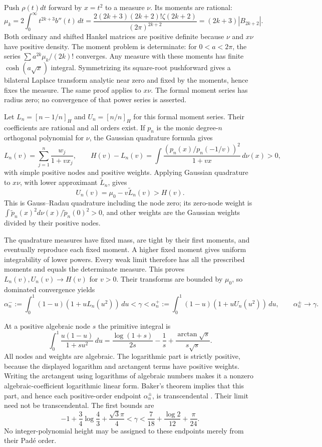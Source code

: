 \documentclass[11pt,a4paper]{article}
\theoremstyle{definition}
\theoremstyle{remark}
\numberwithin{equation}{section}
\begin{document}
Push $\rho(t)dt$ forward by $x=t^2$ to a measure $\nu$. Its moments are rational:
\[
 \mu_k=2\int_0^\infty t^{2k+3}b''(t)\,dt
 =\frac{2(2k+3)(2k+2)!\zeta(2k+2)}{(2\pi)^{2k+2}}
 =(2k+3)|B_{2k+2}|.
\]
Both ordinary and shifted Hankel matrices are positive definite because $\nu$ and $x\nu$ have positive density. The moment problem is determinate: for $0<a<2\pi$, the series $\sum a^{2k}\mu_k/(2k)!$ converges. Any measure with these moments has finite $\cosh(a\sqrt x)$ integral. Symmetrizing its square-root pushforward gives a bilateral Laplace transform analytic near zero and fixed by the moments, hence fixes the measure. The same proof applies to $x\nu$. The formal moment series has radius zero; no convergence of that power series is asserted.

Let $L_n=[n-1/n]_H$ and $U_n=[n/n]_H$ for this formal moment series. Their coefficients are rational and all orders exist. If $p_n$ is the monic degree-$n$ orthogonal polynomial for $\nu$, the Gaussian quadrature formula gives
\begin{equation}\label{inf:eq:pade-error}
 L_n(v)=\sum_{j=1}^n\frac{w_j}{1+vx_j},\qquad
 H(v)-L_n(v)=\int\frac{(p_n(x)/p_n(-1/v))^2}{1+vx}\,d\nu(x)>0,
\end{equation}
with simple positive nodes and positive weights. Applying Gaussian quadrature to $x\nu$, with lower approximant $\widetilde L_n$, gives
\[
 U_n(v)=\mu_0-v\widetilde L_n(v)>H(v).
\]
This is Gauss--Radau quadrature including the node zero; its zero-node weight is $\int\widetilde p_n(x)^2d\nu(x)/\widetilde p_n(0)^2>0$, and other weights are the Gaussian weights divided by their positive nodes.

The quadrature measures have fixed mass, are tight by their first moments, and eventually reproduce each fixed moment. A higher fixed moment gives uniform integrability of lower powers. Every weak limit therefore has all the prescribed moments and equals the determinate measure. This proves $L_n(v),U_n(v)\to H(v)$ for $v>0$. Their transforms are bounded by $\mu_0$, so dominated convergence yields
\begin{equation}\label{inf:eq:pade-bracket}
 \alpha_n^-:=\int_0^1(1-u)(1+uL_n(u^2))\,du
 <\gamma<
 \alpha_n^+:=\int_0^1(1-u)(1+uU_n(u^2))\,du,
 \qquad\alpha_n^\pm\to\gamma.
\end{equation}

At a positive algebraic node $s$ the primitive integral is
\[
 \int_0^1\frac{u(1-u)}{1+su^2}\,du
 =\frac{\log(1+s)}{2s}-\frac1s+
          \frac{\arctan\sqrt s}{s\sqrt s}.
\]
All nodes and weights are algebraic. The logarithmic part is strictly positive, because the displayed logarithm and arctangent terms have positive weights. Writing the arctangent using logarithms of algebraic numbers makes it a nonzero algebraic-coefficient logarithmic linear form. Baker's theorem implies that this part, and hence each positive-order endpoint $\alpha_n^\pm$, is transcendental \cite{inf:Baker}. Their limit need not be transcendental. The first bounds are
\[
 -1+\frac34\log\frac43+\frac{\sqrt3\pi}4
 <\gamma<\frac7{18}+\frac{\log2}{12}+\frac\pi{24}.
\]
No integer-polynomial height may be assigned to these endpoints merely from their Pad\'e order.
\end{document}

